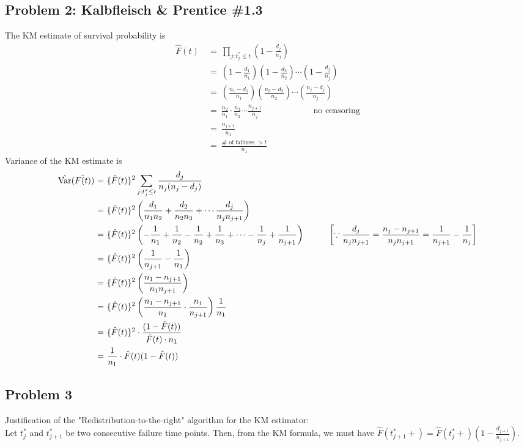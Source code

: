\documentclass[11pt]{extarticle} %
\newcommand{\Var}{\operatorname{Var}}
\begin{document}
\subsection*{Problem 2: Kalbfleisch \& Prentice \#1.3}
\noindent
The KM estimate of survival probability is
\begin{align*}
\hat{F}(t)\ &{=}\ \prod_{j: t_j^* \leq t} \left(1 - \frac{d_j}{n_j} \right) \\
&{=}\ \left(1 - \frac{d_1}{n_1} \right)\left(1 - \frac{d_2}{n_2} \right)\cdots \left(1 - \frac{d_j}{n_j} \right) \\
&{=}\ \left(\frac{n_1 - d_1}{n_1} \right)\left(\frac{n_2 - d_2}{n_2} \right)\cdots \left(\frac{n_j - d_j}{n_j} \right) \\
&{=}\ \frac{n_2}{n_1} \cdot \frac{n_3}{n_2} \cdots \frac{n_{j+1}}{n_j} \hspace{1in} \text{no censoring} \\
&{=}\ \frac{n_{j+1}}{n_1} \\
&{=}\ \frac{\# \text{ of failures } > t}{n_1}
\end{align*}
Variance of the KM estimate is
\begin{align*}
\hat{\Var}(\hat{F(t)}) \ &{=}\ \{\hat{F}(t)\}^2 \sum_{j: t_j^* \leq t} \frac{d_j}{n_j(n_j - d_j)} \\
&{=}\ \{\hat{F}(t)\}^2\left(\frac{d_1}{n_1 n_2} + \frac{d_2}{n_2 n_3} + \cdots \frac{d_j}{n_j n_{j+1}}\right) \\
&{=}\ \{\hat{F}(t)\}^2\left(-\frac{1}{n_1} + \frac{1}{n_2} -\frac{1}{n_2} + \frac{1}{n_3} + \cdots  -\frac{1}{n_j} + \frac{1}{n_{j+1}}\right) \hspace{0.4in} \left[ \because \frac{d_j}{n_jn_{j+1}} = \frac{n_j - n_{j+1}}{n_jn_{j+1}} = \frac{1}{n_{j+1}} - \frac{1}{n_j} \right] \\
&{=}\ \{\hat{F}(t)\}^2 \left( \frac{1}{n_{j+1}} - \frac{1}{n_1}   \right) \\
&{=}\ \{\hat{F}(t)\}^2 \left( \frac{n_1 - n_{j+1}}{n_1n_{j+1}}   \right) \\
&{=}\ \{\hat{F}(t)\}^2 \left( \frac{n_1 - n_{j+1}}{n_1} \cdot \frac{n_1}{n_{j+1}}   \right)\frac{1}{n_1} \\
&{=}\ \{\hat{F}(t)\}^2 \cdot \frac{(1 - \hat{F}(t))}{\hat{F}(t)\cdot n_1} \\
&{=}\ \frac{1}{n_1}\cdot \hat{F}(t) (1 - \hat{F}(t))
\end{align*}
\subsection*{Problem 3}
\noindent
Justification of the "Redistribution-to-the-right" algorithm for the KM estimator:\\
Let $t_j^*$ and $t_{j+1}^*$ be two consecutive failure time points. Then, from the KM formula, we must have $\hat{F}(t^*_{j+1}+) = \hat{F}(t^*_{j}+)\left(1 - \frac{d_{j+1}}{n_{j+1}}\right)$. \\
\end{document}
